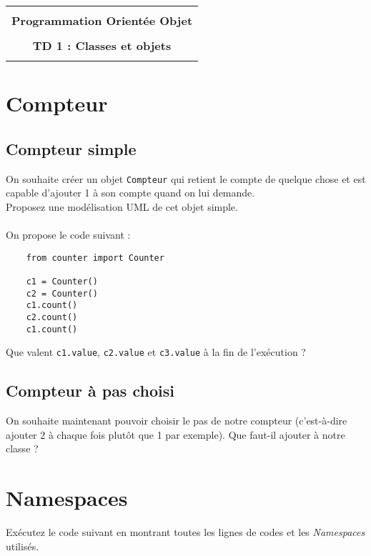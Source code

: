 \documentclass[12pt]{article}
\begin{document}
    \begin{center}
      \begin{tabular}{c}
      \hline
    \\
        {\bf \textsf {\Large Programmation Orientée Objet}}\\
    \\
        {\bf \textsf {\Large TD 1 : Classes et objets}}\\
    \\
        \hline
      \end{tabular}
    \end{center}
    \vspace{15mm}

\section{Compteur}
\subsection{Compteur simple}
On souhaite créer un objet \verb|Compteur| qui retient le compte de quelque chose et est capable d'ajouter 1 à son
compte quand on lui demande.\\

Proposez une modélisation UML de cet objet simple.\\
\\
On propose le code suivant :

\begin{lstlisting}
    from counter import Counter
    
    c1 = Counter()
    c2 = Counter()
    c1.count()
    c2.count()
    c1.count()
\end{lstlisting}
Que valent \verb|c1.value|, \verb|c2.value| et \verb|c3.value| à la fin de l'exécution ? 


\subsection{Compteur à pas choisi}
On souhaite maintenant pouvoir choisir le pas de notre compteur (c'est-à-dire ajouter 2 à chaque fois plutôt que 1 par
exemple). Que faut-il ajouter à notre classe ?

\section{Namespaces}

Exécutez le code suivant en montrant toutes les lignes de codes et les {\em Namespaces} utilisés.
\end{document}
